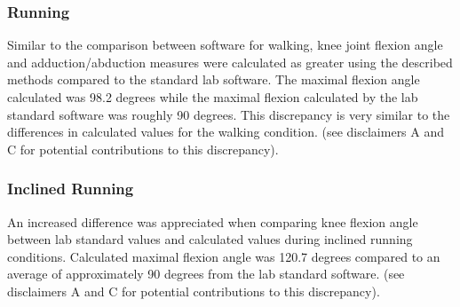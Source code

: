 \documentclass[10pt]{IEEEtran}
\begin{document}
    \subsubsection{Running}
    Similar to the comparison between software for walking, knee joint flexion angle and adduction/abduction measures were calculated as greater using the described methods compared to the standard lab software. The maximal flexion angle calculated was 98.2 degrees while the maximal flexion calculated by the lab standard software was roughly 90 degrees. This discrepancy is very similar to the differences in calculated values for the walking condition. (see disclaimers A and C for potential contributions to this discrepancy).
    \subsubsection{Inclined Running}
    An increased difference was appreciated when comparing knee flexion angle between lab standard values and calculated values during inclined running conditions. Calculated maximal flexion angle was 120.7 degrees compared to an average of approximately 90 degrees from the lab standard software. (see disclaimers A and C for potential contributions to this discrepancy).
\end{document}
